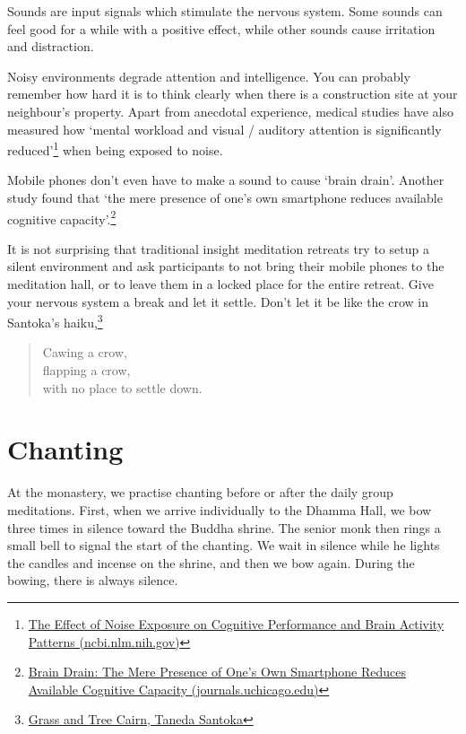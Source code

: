 Sounds are input signals which stimulate the nervous system. Some sounds
can feel good for a while with a positive effect, while other sounds
cause irritation and distraction.

Noisy environments degrade attention and intelligence. You can probably
remember how hard it is to think clearly when there is a construction
site at your neighbour's property. Apart from anecdotal experience,
medical studies have also measured how `mental workload and visual /
auditory attention is significantly reduced'\footnote{\href{https://www.ncbi.nlm.nih.gov/pmc/articles/PMC6901841/}{The
  Effect of Noise Exposure on Cognitive Performance and Brain Activity
  Patterns (ncbi.nlm.nih.gov)}} when being exposed to noise.

\enlargethispage*{\baselineskip}

Mobile phones don't even have to make a sound to cause `brain drain'.
Another study found that `the mere presence of one's own smartphone
reduces available cognitive capacity'.\footnote{\href{https://www.journals.uchicago.edu/doi/10.1086/691462}{Brain
  Drain: The Mere Presence of One's Own Smartphone Reduces Available
  Cognitive Capacity (journals.uchicago.edu)}}

It is not surprising that traditional insight meditation retreats try to
setup a silent environment and ask participants to not bring their
mobile phones to the meditation hall, or to leave them in a locked place
for the entire retreat. Give your nervous system a break and let it
settle. Don't let it be like the crow in Santoka's haiku,\footnote{\href{https://www.goodreads.com/book/show/931086.Grass_and_Tree_Cairn}{Grass
  and Tree Cairn, Taneda Santoka}}

\begin{quote}
Cawing a crow,\\
flapping a crow,\\
with no place to settle down.
\end{quote}

\section{Chanting}


\noindent At the monastery, we practise chanting before or after the
daily group meditations. First, when we arrive individually to the
Dhamma Hall, we bow three times in silence toward the Buddha shrine. The
senior monk then rings a small bell to signal the start of the chanting.
We wait in silence while he lights the candles and incense on the
shrine, and then we bow again. During the bowing, there is always
silence.

